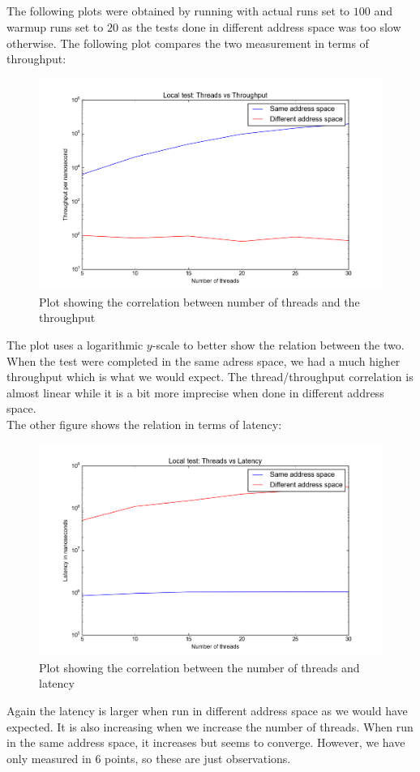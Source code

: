 \documentclass[a4paper]{article}
\begin{document}
\subsection{}
The following plots were obtained by running with actual runs set to $100$ and warmup runs set to $20$ as the tests done in different address space was too slow otherwise. The following plot compares the two measurement in terms of throughput:
\begin{figure}[H]
  \centering
  \includegraphics[scale=0.5]{fig1}
  \caption{Plot showing the correlation between number of threads and the throughput}
\end{figure}
The plot uses a logarithmic $y$-scale to better show the relation between the two. When the test were completed in the same adress space, we had a much higher throughput which is what we would expect. The thread/throughput correlation is almost linear while it is a bit more imprecise when done in different address space. \\
The other figure shows the relation in terms of latency:
\begin{figure}[H]
  \centering
  \includegraphics[scale=0.5]{fig2}
  \caption{Plot showing the correlation between the number of threads and latency}
\end{figure}
Again the latency is larger when run in different address space as we would have expected. It is also increasing when we increase the number of threads. When run in the same address space, it increases but seems to converge. However, we have only measured in $6$ points, so these are just observations.
\end{document}

